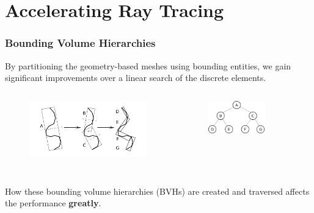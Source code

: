 \documentclass[12pt]{beamer}
\begin{document}
\section{Accelerating Ray Tracing} %


\begin{frame}
\frametitle{Bounding Volume Hierarchies}


By partitioning the geometry-based meshes using bounding entities, we gain significant improvements over a linear search of the discrete elements.
\begin{columns}
  \begin{figure}
    \centering
    \includegraphics[width=1.1\textwidth]{bvh_2d_ex_w_labels.png}
    \begin{flushleft}\cite{gottschalk1996obbtree}\end{flushleft}
  \end{figure}
  
  \begin{figure}
    \centering
    \includegraphics[width=0.7\textwidth]{binary_graph.png}
  \end{figure}
\end{columns}
\vfill
How these bounding volume hierarchies (BVHs) are created and traversed affects the performance \textbf{greatly}.


\end{frame}
\end{document}
